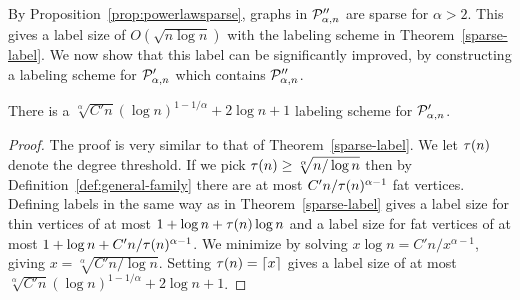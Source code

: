
By Proposition~\ref{prop:powerlawsparse}, graphs in $ \mathcal{P}''_{\alpha,n}$ are sparse for $\alpha > 2$. This gives a label size of $O(\sqrt{n\log n})$ with the labeling scheme in Theorem~\ref{sparse-label}. We now show that this label can be significantly improved, by constructing a labeling scheme for $ \mathcal{P}'_{\alpha,n}$ which contains $ \mathcal{P}''_{\alpha,n}$.

\begin{theorem}\label{prop:labelingMain}
 There is a $\sqrt[\alpha]{C'n}(\log n)^{1 - 1/\alpha} + 2\log n + 1$ labeling scheme for $ \mathcal{P}'_{\alpha,n}$.
\end{theorem}
\begin{proof}
The proof is very similar to that of Theorem~\ref{sparse-label}. We let $\tau(n)$ denote the degree threshold. If we pick $\tau(n)\geq \sqrt[\alpha]{n/\log n}$ then by Definition~\ref{def:general-family}  there are at most $C'n / \tau(n)^{\alpha -1}$ fat vertices. Defining labels in the same way as in Theorem~\ref{sparse-label} gives a label size for thin vertices of at most $1 + \log n + \tau(n)\log n$ and a label size for fat vertices of at most
$1 + \log n + C'n / \tau(n)^{\alpha -1}$.
We minimize by solving
$x \log n = C'n / x^{\alpha -1}$, giving $x = \sqrt[\alpha]{C'n/\log n}$. Setting $\tau(n) = \lceil x\rceil$ gives a label size of at most $\sqrt[\alpha]{C'n}(\log n)^{1 - 1/\alpha} + 2\log n + 1$.
\end{proof}

